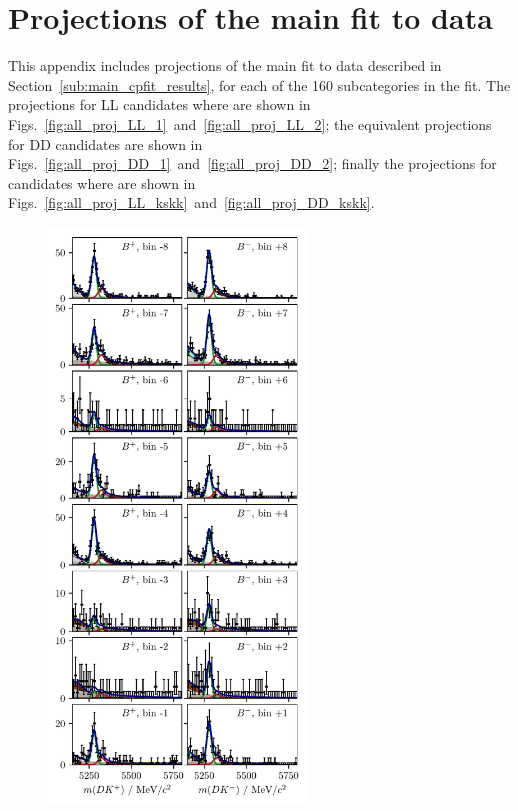 
\chapter{Projections of the main fit to data}
\label{app:main_fit}

This appendix includes projections of the main fit to data described in Section~\ref{sub:main_cpfit_results}, for each of the 160 subcategories in the fit. The projections for LL candidates where \DtoKspp are shown in Figs.~\ref{fig:all_proj_LL_1}~and~\ref{fig:all_proj_LL_2}; the equivalent projections for DD candidates are shown in Figs.~\ref{fig:all_proj_DD_1}~and~\ref{fig:all_proj_DD_2}; finally the projections for candidates where \DtoKskk are shown in Figs.~\ref{fig:all_proj_LL_kskk}~and~\ref{fig:all_proj_DD_kskk}. 


\begin{figure}[tp]
    \centering
    \includegraphics[height=6in]{figures/analysis/bin_by_bin/pretty_fit_bins_dk_LL_1.pdf}

\end{figure}
